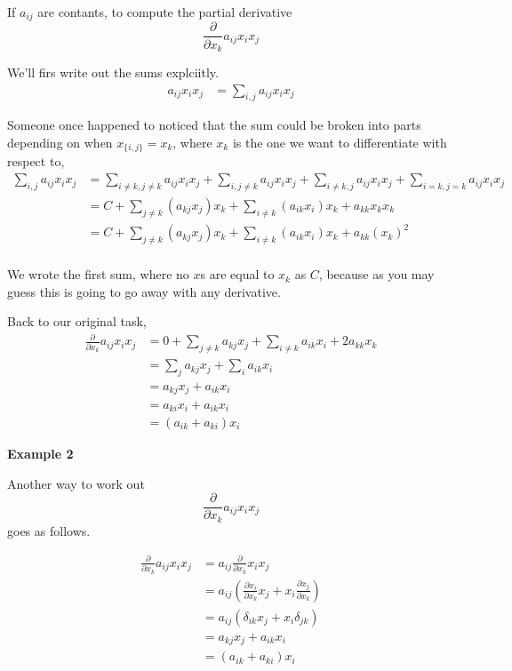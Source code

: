 If $a_{ij}$ are contants, to compute the partial derivative
$$
\frac{\partial}{\partial x_k} a_{ij} x_i x_j
$$

We'll firs write out the sums explciitly.
\begin{align*}
a_{ij} x_i x_j &= \sum_{i,j} a_{ij} x_i x_j
\end{align*}

Someone once happened to noticed that the sum could be broken into parts depending on when $x_{\{i,j\}} = x_k$, where $x_k$
is the one we want to differentiate with respect to,
\begin{align*}
\sum_{i,j} a_{ij} x_i x_j &=
    \sum_{i \neq k, j \neq k} a_{ij} x_i x_j +
    \sum_{i, j \neq k} a_{ij} x_i x_j + 
    \sum_{i \neq k, j} a_{ij} x_i x_j +
    \sum_{i=k, j=k} a_{ij} x_i x_j \\
&= C + \sum_{j \neq k} \left( a_{kj} x_j \right) x_k +
    \sum_{i \neq k} \left( a_{ik} x_i \right) x_k +
    a_{kk} x_k x_k \\
    &= C + \sum_{j \neq k} \left( a_{kj} x_j \right) x_k +
    \sum_{i \neq k} \left( a_{ik} x_i \right) x_k +
    a_{kk} (x_k)^2 \\
\end{align*}

We wrote the first sum, where no $x$s are equal to $x_k$ as $C$, because as you may guess this is going to go away with
any derivative.

Back to our original task,
\begin{align*}
\frac{\partial}{\partial x_k} a_{ij} x_i x_j &=
    0 + \sum_{j \neq k} a_{kj} x_j +
    \sum_{i \neq k} a_{ik} x_i +
    2 a_{kk} x_k \\
&= \sum_{j} a_{kj} x_j + \sum_{i} a_{ik} x_i \\
&= a_{kj} x_j + a_{ik} x_i \\
&= a_{ki} x_i + a_{ik} x_i \\
&= (a_{ik} + a_{ki}) x_i
\end{align*}



\textbf{Example 2}

Another way to work out
$$
\frac{\partial}{\partial x_k} a_{ij} x_i x_j
$$
goes as follows.

\begin{align*}
\frac{\partial}{\partial x_k} a_{ij} x_i x_j &= a_{ij} \frac{\partial}{\partial x_k} x_i x_j \\
&= a_{ij} \left( \frac{\partial x_i}{\partial x_k} x_j + x_i \frac{\partial x_j}{\partial x_k} \right) \\
&= a_{ij} \left( \delta_{ik} x_j + x_i \delta_{jk} \right) \\
&= a_{kj} x_j + a_{ik} x_i \\
&= (a_{ik} + a_{ki}) x_i
\end{align*}


